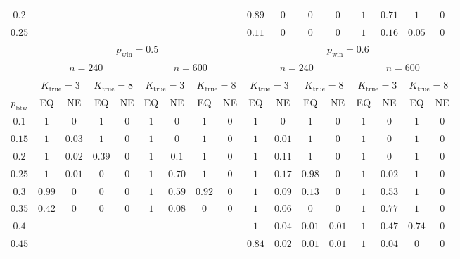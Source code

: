 \documentclass[12pt, titlepage, reqno]{article}
\begin{document}
\begin{table}[tbp]
\begin{tabular}{c cccc cccc cccc cccc}
		$0.2$ &   &   &   &   &   &   &   &   & $0.89$ & $0$ & $0$ & 
		$0$ & $1$ & $0.71$ & $1$ & $0$ \\
		$0.25$ &   &   &   &   &   &   &   &   & $0.11$ & $0$ & $0$ 
		& $0$ & $1$ & $0.16$ & $0.05$ & $0$ \\
		\midrule
		& \multicolumn{8}{c}{$p_{\text{win}} = 0.5$} & 
		\multicolumn{8}{c}{$p_{\text{win}} = 0.6$} \\
		\cmidrule(lr){2-9} \cmidrule(lr){10-17}
		& \multicolumn{4}{c}{$n = 240$} & \multicolumn{4}{c}{$n = 
		600$} 
		& \multicolumn{4}{c}{$n = 240$} & \multicolumn{4}{c}{$n = 
		600$} \\
		\cmidrule(lr){2-5} \cmidrule(lr){6-9} \cmidrule(lr){10-13} 
		\cmidrule(lr){14-17}
		& \multicolumn{2}{c}{$K_{\text{true}} = 3$} & 
		\multicolumn{2}{c}{$K_{\text{true}} = 8$} 
		& \multicolumn{2}{c}{$K_{\text{true}} = 3$} & 
		\multicolumn{2}{c}{$K_{\text{true}} = 8$}
		& \multicolumn{2}{c}{$K_{\text{true}} = 3$} & 
		\multicolumn{2}{c}{$K_{\text{true}} = 8$}
		& \multicolumn{2}{c}{$K_{\text{true}} = 3$} & 
		\multicolumn{2}{c}{$K_{\text{true}} = 8$} \\
		\cmidrule(lr){2-3} \cmidrule(lr){4-5} \cmidrule(lr){6-7} 
		\cmidrule(lr){8-9}
		\cmidrule(lr){10-11} \cmidrule(lr){12-13} 
		\cmidrule(lr){14-15} \cmidrule(lr){16-17}
		$p_{\text{btw}}$ & EQ & NE & EQ & NE & EQ & NE & EQ & NE 
		& EQ & NE & EQ & NE & EQ & NE & EQ & NE \\
		\midrule
		$0.1$ & $1$ & $0$ & $1$ & $0$ & $1$ & $0$ & $1$ & $0$ & $1$ 
		& $0$ & $1$ & $0$ & $1$ & $0$ & $1$ & $0$ \\ 
		$0.15$ & $1$ & $0.03$ & $1$ & $0$ & $1$ & $0$ & $1$ & $0$ 
		& $1$ & $0.01$ & $1$ & $0$ & $1$ & $0$ & $1$ & $0$ \\ 
		$0.2$ & $1$ & $0.02$ & $0.39$ & $0$ & $1$ & $0.1$ & $1$ & 
		$0$ & $1$ & $0.11$ & $1$ & $0$ & $1$ & $0$ & $1$ & $0$ \\ 
		$0.25$ & $1$ & $0.01$ & $0$ & $0$ & $1$ & $0.70$ & $1$ & $0$ 
		& $1$ & $0.17$ & $0.98$ & $0$ & $1$ & $0.02$ & $1$ & $0$ \\ 
		$0.3$ & $0.99$ & $0$ & $0$ & $0$ & $1$ & $0.59$ & $0.92$ & 
		$0$ & $1$ & $0.09$ & $0.13$ & $0$ & $1$ & $0.53$ & $1$ & $0$ 
		\\ 
		$0.35$ & $0.42$ & $0$ & $0$ & $0$ & $1$ & $0.08$ & $0$ & $0$ 
		& $1$ & $0.06$ & $0$ & $0$ & $1$ & $0.77$ & $1$ & $0$ \\ 
		$0.4$ & &  &  &  &  &  &  &  & $1$ & $0.04$ & $0.01$ & 
		$0.01$ & $1$ & $0.47$ & $0.74$ & $0$ \\ 
		$0.45$ &  &  &  & & &  &  & & $0.84$ & $0.02$ & $0.01$ & 
		$0.01$ & $1$ & $0.04$ & $0$ & $0$ \\ 
		\bottomrule
	\end{tabular}
\end{table}
\end{document}
